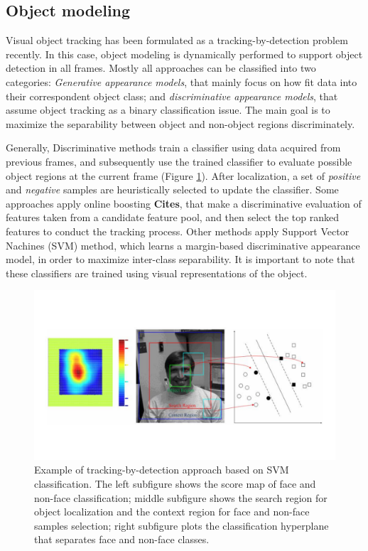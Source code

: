 \subsection{Object modeling}

Visual object tracking has been formulated as a tracking-by-detection problem recently. In this case, object modeling is dynamically performed to support object detection in all frames. Mostly all approaches can be classified into two categories: \textit{Generative appearance models}, that mainly focus on how fit data into their correspondent object class; and \textit{discriminative appearance models}, that assume object tracking as a binary classification issue. The main goal is to maximize the separability between object and non-object regions discriminately.

Generally, Discriminative methods train a classifier using data acquired from previous frames, and subsequently use the trained classifier to evaluate possible object regions at the current frame (Figure \ref{fig::svm_example}). After localization, a set of \textit{positive} and \textit{negative} samples are heuristically selected to update the classifier. Some approaches apply online boosting \textbf{Cites}, that make a discriminative evaluation of features taken from a candidate feature pool, and then select the top ranked features to conduct the tracking process. Other methods apply Support Vector Nachines (SVM) method, which learns a margin-based discriminative appearance model, in order to maximize inter-class separability. It is important to note that these classifiers are trained using visual representations of the object.

\begin{figure}[t!]
		\includegraphics[width=1\linewidth, trim= 0cm 3cm 1cm 4cm, clip=true]{Figures/svm_example.pdf}
	\caption{Example of tracking-by-detection approach based on SVM classification. The left subfigure shows the score map of face and non-face classification; middle subfigure shows the search region for object localization and the context region for face and non-face samples selection; right subfigure plots the classification hyperplane that separates face and non-face classes.}
	\label{fig::svm_example}
\end{figure}


